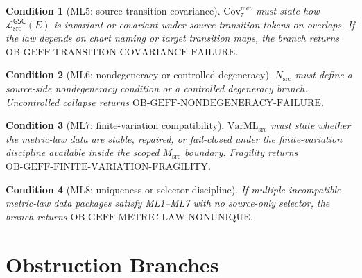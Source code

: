 \documentclass[11pt]{article}
\newcommand{\Msrc}{M_{\mathrm{src}}}
\newcommand{\MetricData}{\mathcal{L}_{\mathrm{src}}^{\mathsf{GSC}}}
\newtheorem{condition}{Condition}
\begin{document}
\begin{condition}[ML5: source transition covariance]
\(\mathrm{Cov}_{\tau}^{\mathrm{met}}\) must state how
\(\MetricData(E)\) is invariant or covariant under source transition tokens on
overlaps. If the law depends on chart naming or target transition maps, the
branch returns
\(\mathrm{OB\mbox{-}GEFF\mbox{-}TRANSITION\mbox{-}COVARIANCE\mbox{-}FAILURE}\).
\end{condition}

\begin{condition}[ML6: nondegeneracy or controlled degeneracy]
\(N_{\mathrm{src}}\) must define a source-side nondegeneracy condition or a
controlled degeneracy branch. Uncontrolled collapse returns
\(\mathrm{OB\mbox{-}GEFF\mbox{-}NONDEGENERACY\mbox{-}FAILURE}\).
\end{condition}

\begin{condition}[ML7: finite-variation compatibility]
\(\mathrm{VarML}_{\mathrm{src}}\) must state whether the metric-law data are
stable, repaired, or fail-closed under the finite-variation discipline
available inside the scoped \(\Msrc\) boundary. Fragility returns
\(\mathrm{OB\mbox{-}GEFF\mbox{-}FINITE\mbox{-}VARIATION\mbox{-}FRAGILITY}\).
\end{condition}

\begin{condition}[ML8: uniqueness or selector discipline]
If multiple incompatible metric-law data packages satisfy ML1--ML7 with no
source-only selector, the branch returns
\(\mathrm{OB\mbox{-}GEFF\mbox{-}METRIC\mbox{-}LAW\mbox{-}NONUNIQUE}\).
\end{condition}

\section{Obstruction Branches}
\end{document}
